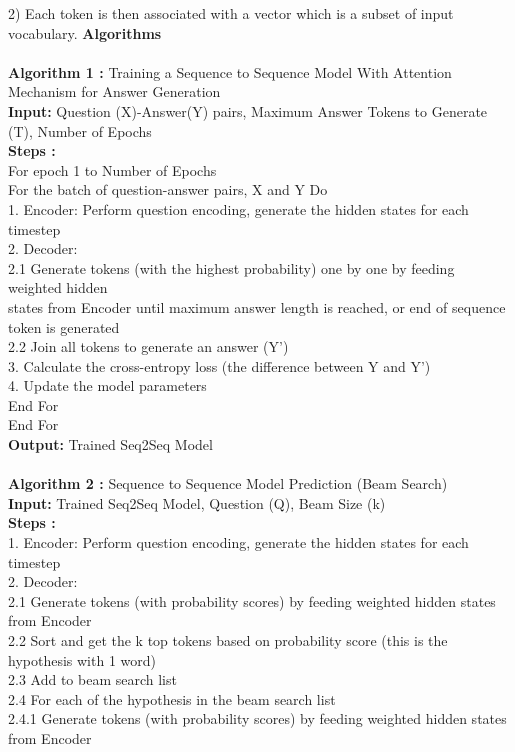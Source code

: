 \documentclass[12pt,a4paper]{report}     %
\begin{document}
\begin{normalsize}
{2) Each token is then associated with a vector which is a subset of input vocabulary.
\newpage
{\large \bf Algorithms} \\  \\ 
{\bf Algorithm 1 : }Training a Sequence to Sequence Model With Attention
Mechanism for Answer Generation \\
{\bf Input:} Question (X)-Answer(Y) pairs, Maximum Answer Tokens to Generate (T), Number of Epochs \\
{\bf Steps :} \\
For epoch 1 to Number of Epochs \\
For the batch of question-answer pairs, X and Y Do \\
1. Encoder: Perform question encoding, generate the hidden states for each timestep \\
2. Decoder: \\
2.1 Generate tokens (with the highest probability) one by one by feeding weighted hidden \\
states from Encoder until maximum answer length is reached, or end of sequence token is generated \\
2.2 Join all tokens to generate an answer (Y') \\
3. Calculate the cross-entropy loss (the difference between Y and Y') \\
4. Update the model parameters \\
End For \\
End For \\
{\bf Output:} Trained Seq2Seq Model \\ \\
{\bf Algorithm 2 : }Sequence to Sequence Model Prediction (Beam Search) \\
{\bf Input:} Trained Seq2Seq Model, Question (Q), Beam Size (k) \\
{\bf Steps :} \\
1. Encoder: Perform question encoding, generate the hidden states for each timestep \\
2. Decoder: \\
2.1 Generate tokens (with probability scores) by feeding weighted hidden states from Encoder \\
2.2 Sort and get the k top tokens based on probability score (this is the hypothesis with 1 word) \\
2.3 Add to beam search list \\
2.4 For each of the hypothesis in the beam search list \\
2.4.1 Generate tokens (with probability scores) by feeding weighted hidden states from Encoder \\
}
\end{normalsize}
\end{document}
